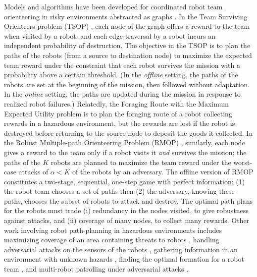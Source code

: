 \documentclass[11pt, oneside]{article}
\begin{document}
Models and algorithms have been developed for coordinated robot team orienteering in risky environments abstracted as graphs \cite{zhou2021multi}. 
In the Team Surviving Orienteers problem (TSOP) \cite{jorgensen2018team,jorgensen2017matroid,jorgensen2024matroid}, each node of the graph offers a reward to the team when visited by a robot, and each edge-traversal by a robot incurs an independent probability of destruction. 
The objective in the TSOP is to plan the paths of the robots (from a source to destination node) to maximize the expected team reward under the constraint that each robot survives the mission with a probability above a certain threshold. 
(In the \emph{offline} setting, the paths of the robots are set at the beginning of the mission, then followed without adaptation. In the \emph{online} setting, the paths are updated during the mission in response to realized robot failures.)
Relatedly, the Foraging Route with the Maximum Expected Utility problem \cite{di2022foraging} is to plan the foraging route of a robot collecting rewards in a hazardous environment, but the rewards are lost if the robot is destroyed before returning to the source node to deposit the goods it collected.
In the Robust Multiple-path Orienteering Problem (RMOP) \cite{shi2023robust}, similarly, each node gives a reward to the team only if a robot visits it \emph{and} survives the mission; the paths of the $K$ robots are planned to maximize the team reward under the worst-case attacks of $\alpha<K$ of the robots by an adversary. 
The offline version of RMOP constitutes a two-stage, sequential, one-step game with perfect information: (1) the robot team chooses a set of paths then (2) the adversary, knowing these paths, chooses the subset of robots to attack and destroy. 
The optimal path plans for the robots must trade (i) redundancy in the nodes visited, to give robustness against attacks, and (ii) coverage of many nodes, to collect many rewards.
Other work involving robot path-planning in hazardous environments includes 
maximizing coverage of an area containing threats to robots \cite{korngut2023multi,yehoshua2016robotic}, 
handling adversarial attacks on the sensors of the robots \cite{liu2021distributed,zhou2022distributed,mayya2022adaptive,zhou2018resilient}, 
gathering information in an environment with unknown hazards \cite{schwager2017multi},
finding the optimal formation for a robot team \cite{shapira2015path},
and 
multi-robot patrolling under adversarial attacks \cite{huang2019survey}.
\end{document}
